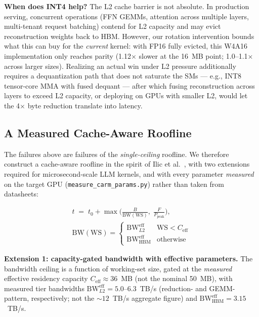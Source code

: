 \documentclass[10pt,twocolumn]{article}
\begin{document}
\textbf{When does INT4 help?}  The L2 cache barrier is not absolute.  In production serving, concurrent operations (FFN GEMMs, attention across multiple layers, multi-tenant request batching) contend for L2 capacity and may evict reconstruction weights back to HBM.  However, our rotation intervention bounds what this can buy for the \emph{current} kernel: with FP16 fully evicted, this W4A16 implementation only reaches parity (1.12$\times$ slower at the 16~MB point; 1.0--1.1$\times$ across larger sizes).  Realizing an actual win under L2 pressure additionally requires a dequantization path that does not saturate the SMs --- e.g., INT8 tensor-core MMA with fused dequant --- after which fusing reconstruction across layers to exceed L2 capacity, or deploying on GPUs with smaller L2, would let the 4$\times$ byte reduction translate into latency.

\subsection{A Measured Cache-Aware Roofline}
\label{sec:carm}

The failures above are failures of the \emph{single-ceiling} roofline.  We therefore construct a cache-aware roofline in the spirit of Ilic et al.~\cite{carm}, with two extensions required for microsecond-scale LLM kernels, and with every parameter \emph{measured} on the target GPU (\texttt{measure\_carm\_params.py}) rather than taken from datasheets:

\begin{equation}
\begin{gathered}
t \;=\; t_0 + \max\!\Big(\frac{B}{\mathrm{BW}(\mathrm{WS})},\; \frac{F}{P_\text{peak}}\Big),\\[4pt]
\mathrm{BW}(\mathrm{WS}) =
\begin{cases}
\mathrm{BW}_{L2}^{\text{eff}} & \mathrm{WS} < C_\text{eff}\\[2pt]
\mathrm{BW}_{\text{HBM}}^{\text{eff}} & \text{otherwise}
\end{cases}
\end{gathered}
\label{eq:carm}
\end{equation}

\textbf{Extension 1: capacity-gated bandwidth with effective parameters.}  The bandwidth ceiling is a function of working-set size, gated at the \emph{measured} effective residency capacity $C_\text{eff} \approx 36$~MB (not the nominal 50~MB), with measured tier bandwidths $\mathrm{BW}_{L2}^{\text{eff}} = 5.0$--$6.3$~TB/s (reduction- and GEMM-pattern, respectively; not the ${\sim}12$~TB/s aggregate figure) and $\mathrm{BW}_{\text{HBM}}^{\text{eff}} = 3.15$~TB/s.
\end{document}
